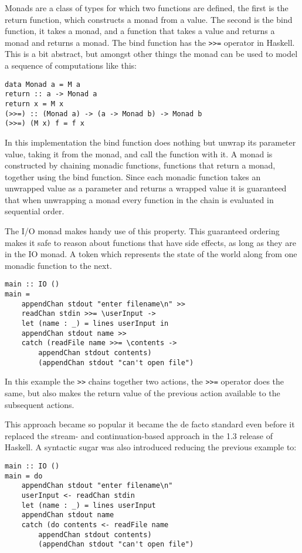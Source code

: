 Monads are a class of types for which two functions are defined, the first is the return function, which constructs a monad from a value.
 The second is the bind function, it takes a monad, and a function that takes a value and returns a monad and returns a monad.
The bind function has the \lstinline{>>=} operator in Haskell.
 This is a bit abstract, but amongst other things the monad can be used to model a sequence of computations like this:

\begin{lstlisting}[caption={Sequence of computations monad}]
data Monad a = M a
return :: a -> Monad a
return x = M x
(>>=) :: (Monad a) -> (a -> Monad b) -> Monad b
(>>=) (M x) f = f x
\end{lstlisting}

In this implementation the bind function does nothing but unwrap its parameter value, taking it from the monad, and call the function with it.
A monad is constructed by chaining monadic functions, functions that return a monad, together using the bind function. Since each monadic function takes an unwrapped value as a parameter and returns a wrapped value it is guaranteed that when unwrapping a monad every function in the chain is evaluated in sequential order.

The I/O monad makes handy use of this property. This guaranteed ordering makes it safe to reason about functions that have side effects, as long as they are in the IO monad. 
A token which represents the state of the world along from one monadic function to the next.

\begin{lstlisting}[caption={Example of monadic I/O in Haskell}]
main :: IO ()
main =
	appendChan stdout "enter filename\n" >>
	readChan stdin >>= \userInput ->
	let (name : _) = lines userInput in
	appendChan stdout name >>
	catch (readFile name >>= \contents ->
		appendChan stdout contents)
		(appendChan stdout "can't open file")
\end{lstlisting}

In this example the \lstinline!>>! chains together two actions, the \lstinline!>>=! operator does the same, but also makes the return value of the previous action available to the subsequent actions.

This approach became so popular it became the de facto standard even before it replaced the stream- and continuation-based approach in the 1.3 release of Haskell\cite{haskell12to13}. A syntactic sugar was also introduced reducing the previous example to:

\begin{lstlisting}[caption={Example of monadic I/O in Haskell}]
main :: IO ()
main = do
	appendChan stdout "enter filename\n"
	userInput <- readChan stdin
	let (name : _) = lines userInput
	appendChan stdout name
	catch (do contents <- readFile name
		appendChan stdout contents)
		(appendChan stdout "can't open file")
\end{lstlisting}
